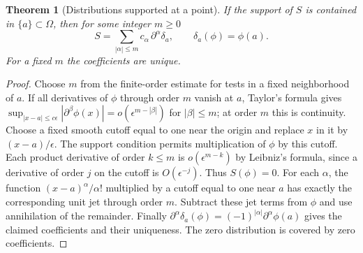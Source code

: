 \documentclass[11pt,oneside,openany]{book}
\newtheorem{theorem}{Theorem}[chapter]
\theoremstyle{definition}
\theoremstyle{remark}
\begin{document}
\begin{theorem}[Distributions supported at a point]
\label{p102:U4-03}
If the support of \(S\) is contained in \(\{a\}\subset\Omega\), then for some integer \(m\geq0\)
\[
 S=\sum_{|\alpha|\leq m}c_\alpha\,\partial^\alpha\delta_a,\qquad
 \delta_a(\phi)=\phi(a).
\]
For a fixed \(m\) the coefficients are unique.
\end{theorem}
\begin{proof}
Choose \(m\) from the finite-order estimate for tests in a fixed neighborhood of \(a\). If all derivatives of \(\phi\) through order \(m\) vanish at \(a\), Taylor's formula gives
\(\sup_{|x-a|\leq c\epsilon}|\partial^\beta\phi(x)|=o(\epsilon^{m-|\beta|})\) for \(|\beta|\leq m\); at order \(m\) this is continuity. Choose a fixed smooth cutoff equal to one near the origin and replace \(x\) in it by \((x-a)/\epsilon\). The support condition permits multiplication of \(\phi\) by this cutoff. Each product derivative of order \(k\leq m\) is \(o(\epsilon^{m-k})\) by Leibniz's formula, since a derivative of order \(j\) on the cutoff is \(O(\epsilon^{-j})\). Thus \(S(\phi)=0\). For each \(\alpha\), the function \((x-a)^\alpha/\alpha!\) multiplied by a cutoff equal to one near \(a\) has exactly the corresponding unit jet through order \(m\). Subtract these jet terms from \(\phi\) and use annihilation of the remainder. Finally \(\partial^\alpha\delta_a(\phi)=(-1)^{|\alpha|}\partial^\alpha\phi(a)\) gives the claimed coefficients and their uniqueness. The zero distribution is covered by zero coefficients.
\end{proof}
\end{document}
